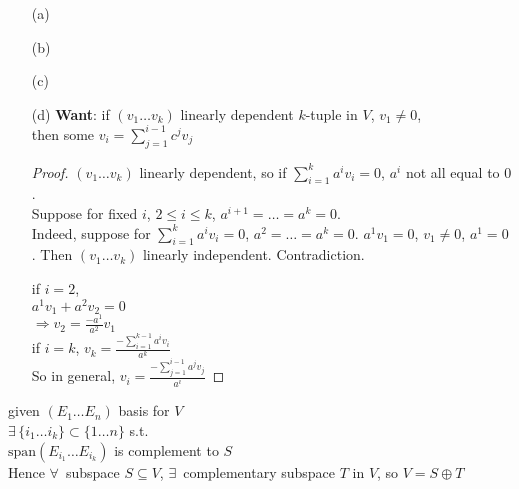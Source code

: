 \begin{enumerate}
  \item[(a)]
\item[(b)]
\item[(c)]
\item[(d)] \textbf{Want}: if $(v_1 \dots v_k)$ linearly dependent $k$-tuple in $V$, $v_1 \neq 0$, \\
then some $v_i = \sum_{j=1}^{i-1} c^j v_j$ \\
\begin{proof}
$(v_1 \dots v_k)$ linearly dependent, so if $\sum_{i=1}^k a^i v_i = 0$, $a^i$ not all equal to $0$.  \\

Suppose for fixed $i$, $2\leq i \leq k$, $a^{i+1} = \dots =a^k=0$. \\
\quad Indeed, suppose for $\sum_{i=1}^k a^i v_i = 0$, $a^2 = \dots = a^k = 0$.  $a^1 v_1 =0$, $v_1 \neq 0$, $a^1 =0$.  Then $(v_1 \dots v_k)$ linearly independent.  Contradiction.  

if $i=2$, \\
\phantom{\quad} $a^1 v_1 + a^2 v_2 =0$ \\
\phantom{\quad \,} $\Longrightarrow v_2  = \frac{-a^1}{a^2} v_1$ \\

if $i=k$, $v_k = \frac{ -\sum_{i=1}^{k-1} a^i v_i }{ a^k}$  \\

So in general, $v_i = \frac{ -\sum_{j=1}^{i-1} a^j v_j }{ a^i}$
\end{proof}
\end{enumerate}

given $(E_1 \dots E_n)$ basis for $V$ \\
\phantom{ \quad } $\exists \, \lbrace i_1 \dots i_k \rbrace \subset \lbrace 1 \dots n \rbrace$ s.t. \\
\phantom{ \quad \, } $ \text{span}(E_{i_1} \dots E_{i_k} )$ is complement to $S$ \\

Hence $\forall \, $ subspace $S \subseteq V$, $\exists \, $ complementary subspace $T$ in $V$, so $V = S \oplus T$

